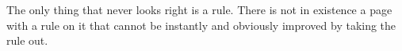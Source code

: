The only thing that never looks right is a rule. There is not in existence a page with a rule on it that cannot be instantly and obviously improved by taking the rule out.  

